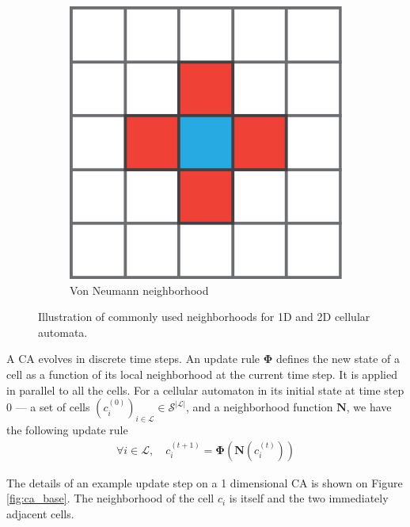 \begin{figure}[htbp]
\begin{subfigure}[c]{.3\linewidth}
    \centering
    \includegraphics[width=\linewidth]{figures/von_neumann}
    \caption{Von Neumann neighborhood}
    \label{fig:von_neumann}
  \end{subfigure}

  \caption{Illustration of commonly used neighborhoods for 1D and 2D cellular automata.}
  \label{fig:neighborhoods}
\end{figure}

A \ac{CA} evolves in discrete time steps. An update rule $\boldsymbol{\Phi}$
defines the new state of a cell as a function of its local neighborhood at the
current time step. It is applied in parallel to all the cells. For a cellular
automaton in its initial state at time step 0 --- \ie a set of cells
$\left(c_{i}^{(0)}\right)_{i \in \mathcal{L}} \in \mathcal{S}^{|\mathcal{L}|}$, and a neighborhood function
$\boldsymbol{N}$, we have the following update rule
\begin{equation}
\begin{aligned}
\forall i \in \mathcal{L}, \quad c_{i}^{(t + 1)} = \boldsymbol{\Phi}\left(\boldsymbol{N}\left(c_{i}^{(t)}\right)\right)
\end{aligned}
\end{equation}

The details of an example update step on a 1 dimensional \ac{CA} is shown on
Figure \ref{fig:ca_base}. The neighborhood of the cell $c_{i}$ is itself and the
two immediately adjacent cells.

